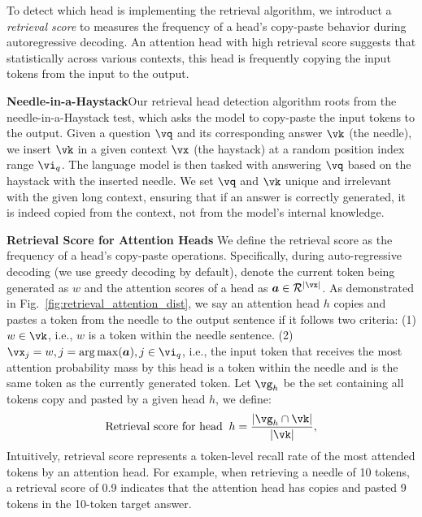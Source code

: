 


To detect which head is implementing the retrieval algorithm, we introduct a \textit{retrieval score} to measures the frequency of a head's copy-paste behavior during autoregressive decoding. 
An attention head with high retrieval score suggests that statistically across various contexts, this head is frequently copying the input tokens from the input to the output. 


\textbf{Needle-in-a-Haystack}\quad\quad Our retrieval head detection algorithm roots from the needle-in-a-Haystack test, which asks the model to copy-paste the input tokens to the output.
Given a question $\vq$ and its corresponding answer $\vk$ (the needle),  we insert $\vk$ in a given context  $\vx$  (the haystack) at a random position index range $\vi_q$.
The language model is then tasked with answering $\vq$ based on the haystack with the inserted needle.
We set $\vq$ and $\vk$ unique and irrelevant with the given long context,
ensuring that if an answer is correctly generated, it is indeed copied from the context, not from the model's internal knowledge.

\textbf{Retrieval Score for Attention Heads}\quad\quad 
We define the retrieval score as the frequency of a head's copy-paste operations. 
Specifically, 
during auto-regressive decoding (we use greedy decoding by default), 
denote the current token being generated as $w$ and
the attention scores of a head as $\boldsymbol{a} \in \mathcal{R}^{|\vx|}$.
As demonstrated in Fig.~\ref{fig:retrieval_attention_dist}, we say an attention head $h$ copies and pastes a token from the needle to the output sentence if it follows two criteria: 
(1) $w \in \vk$, i.e., $w$ is a token within the needle sentence. (2)
$\vx_j= w, j = \arg\max(\boldsymbol{a}), j \in \vi_q$, i.e., the input token that receives the most attention probability mass by this head is a token within the needle and is the same token as the currently generated token. 
Let $\vg_h$ be the set containing all tokens copy and pasted by a given head $h$, we define:
%
\begin{equation}
    \text{Retrieval score for head}\;\; h = \frac{|\vg_h \cap \vk |}{|\vk|}, 
\end{equation}
%
Intuitively, retrieval score  represents a token-level recall rate of the most attended tokens by an attention head.
For example, when retrieving a needle of 10 tokens, a retrieval score of 0.9 indicates that the attention head has copies and pasted 9 tokens in the 10-token target answer.

